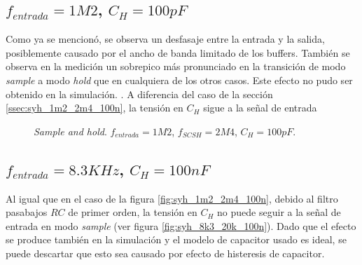 \documentclass[../../ASSD_TP1_G7.tex]{subfiles}
\begin{document}
\subsection{$f_{entrada}=1M2$, $C_H = 100pF$ } \label{ssec:syh_1m2_2m4_100p}
Como ya se mencion\'o, se observa un desfasaje entre la entrada y la salida, posiblemente causado por el ancho de banda limitado de los buffers. 
Tambi\'en se observa en la medici\'on un sobrepico m\'as pronunciado en la transici\'on de modo \textit{sample} a modo \textit{hold} que en cualquiera de los otros casos. 
Este efecto no pudo ser obtenido en la simulaci\'on. . 
A diferencia del caso de la secci\'on \ref{ssec:syh_1m2_2m4_100n}, la tensi\'on en $C_H$ sigue a la se\~nal de entrada


\begin{figure}[H]
	\centering
	\begin{subfigure}[t]{0.45\linewidth}
		
		\label{fig:syh_1m2_2m4_100p_med}	
	\end{subfigure}
	\begin{subfigure}[t]{0.45\linewidth}
		
		\label{fig:syh_1m2_2m4_100p_med}
	\end{subfigure}
	\caption{\textit{Sample and hold}. $f_{entrada} = 1M2$, $f_{SCSH}=2M4$, $C_H = 100pF$.}
	\label{fig:syh_1m2_2m4_100p}
\end{figure}

\subsection{$f_{entrada}=8.3KHz$, $C_H = 100nF$ }
Al igual que en el caso de la figura \ref{fig:syh_1m2_2m4_100n}, debido al filtro pasabajos $RC$ de primer orden, la tensi\'on en $C_H$ no puede seguir a la se\~nal de entrada en modo \textit{sample} (ver figura \ref{fig:syh_8k3_20k_100n}). Dado que el efecto se produce tambi\'en en la simulaci\'on y el modelo de capacitor usado es ideal, se puede descartar que esto sea causado por efecto de histeresis de capacitor. 

\end{document}
